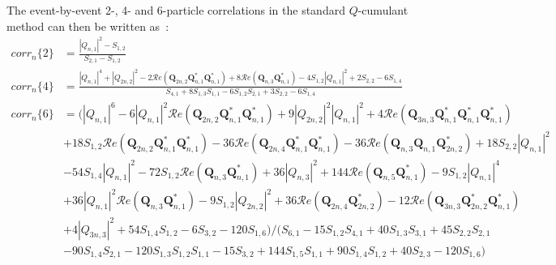 The event-by-event 2-, 4- and 6-particle correlations in the standard $Q$-cumulant method can then be written as~\cite{Bilandzic:2010jr}:
\begin{equation}
\begin{split}
corr_n\{2\}&=\frac{|Q_{n,1}|^2-S_{1,2}}{S_{2,1}-S_{1,2}} \\
corr_n\{4\}&=\frac{|Q_{n,1}|^4+|Q_{2n,2}|^2-2\mathcal{R}\textit{e}(\pmb{Q}_{2n,2}\pmb{Q}_{n,1}^*\pmb{Q}_{n,1}^*)+8\mathcal{R}\textit{e}(\pmb{Q}_{n,3}\pmb{Q}_{n,1}^*)-4S_{1,2}|Q_{n,1}|^2+2S_{2,2}-6S_{1,4}}{S_{4,1}+8S_{1,3}S_{1,1}-6S_{1,2}S_{2,1}+3S_{2,2}-6S_{1,4}} \\
corr_n\{6\}&=(|Q_{n,1}|^6-6|Q_{n,1}|^2\mathcal{R}\textit{e}(\pmb{Q}_{2n,2}\pmb{Q}_{n,1}^*\pmb{Q}_{n,1}^*)+9|Q_{2n,2}|^2|Q_{n,1}|^2+4\mathcal{R}\textit{e}(\pmb{Q}_{3n,3}\pmb{Q}_{n,1}^*\pmb{Q}_{n,1}^*\pmb{Q}_{n,1}^*) \\
&+18S_{1,2}\mathcal{R}\textit{e}(\pmb{Q}_{2n,2}\pmb{Q}_{n,1}^*\pmb{Q}_{n,1}^*)-36\mathcal{R}\textit{e}(\pmb{Q}_{2n,4}\pmb{Q}_{n,1}^*\pmb{Q}_{n,1}^*)-36\mathcal{R}\textit{e}(\pmb{Q}_{n,3}\pmb{Q}_{n,1}\pmb{Q}_{2n,2}^*)+18S_{2,2}|Q_{n,1}|^2 \\
&-54S_{1,4}|Q_{n,1}|^2-72S_{1,2}\mathcal{R}\textit{e}(\pmb{Q}_{n,3}\pmb{Q}_{n,1}^*)+36|Q_{n,3}|^2+144\mathcal{R}\textit{e}(\pmb{Q}_{n,5}\pmb{Q}_{n,1}^*)-9S_{1,2}|Q_{n,1}|^4 \\
&+36|Q_{n,1}|^2\mathcal{R}\textit{e}(\pmb{Q}_{n,3}\pmb{Q}_{n,1}^*)-9S_{1,2}|Q_{2n,2}|^2+36\mathcal{R}\textit{e}(\pmb{Q}_{2n,4}\pmb{Q}_{2n,2}^*)-12\mathcal{R}\textit{e}(\pmb{Q}_{3n,3}\pmb{Q}_{2n,2}^*\pmb{Q}_{n,1}^*) \\
&+4|Q_{3n,3}|^2+54S_{1,4}S_{1,2}-6S_{3,2}-120S_{1,6})/(S_{6,1}-15S_{1,2}S_{4,1}+40S_{1,3}S_{3,1}+45S_{2,2}S_{2,1} \\
&-90S_{1,4}S_{2,1}-120S_{1,3}S_{1,2}S_{1,1}-15S_{3,2}+144S_{1,5}S_{1,1}+90S_{1,4}S_{1,2}+40S_{2,3}-120S_{1,6})
\end{split}
\end{equation}


